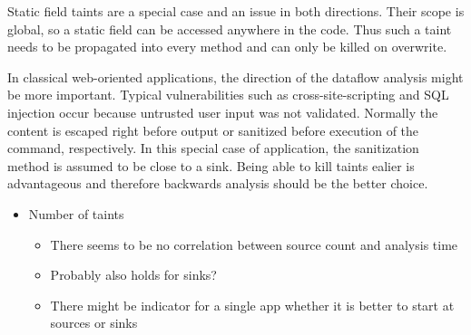 \documentclass[../draft.tex]{subfiles}
\begin{document}
    Static field taints are a special case and an issue in both directions. Their scope is global, so a static field can be accessed anywhere in the code. Thus such a taint needs to be propagated into every method and can only be killed on overwrite.

    In classical web-oriented applications, the direction of the dataflow analysis might be more important. Typical vulnerabilities such as cross-site-scripting and SQL injection occur because untrusted user input was not validated. Normally the content is escaped right before output or sanitized before execution of the command, respectively. In this special case of application, the sanitization method is assumed to be close to a sink. Being able to kill taints ealier is advantageous and therefore backwards analysis should be the better choice.

    \begin{itemize}
        \item Number of taints
        \begin{itemize}
            \item There seems to be no correlation between source count and analysis time
            \item Probably also holds for sinks?
            \item There might be indicator for a single app whether it is better to start at sources or sinks
        \end{itemize}
    \end{itemize}
\end{document}
